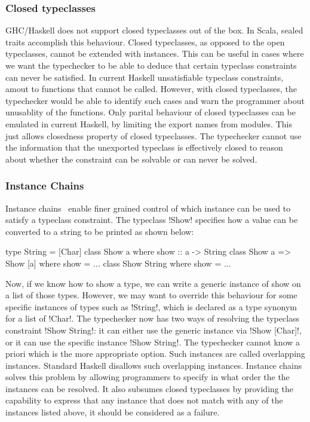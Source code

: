 \documentclass[screen,nonacm,manuscript,review]{acmart} %
\begin{document}
\subsubsection{Closed typeclasses}
GHC/Haskell does not support closed typeclasses out of the box. In Scala, sealed traits accomplish this behaviour. Closed typeclasses, as opposed to the open typeclasses, cannot be extended with instances. This can be useful in cases where we want the typechecker to be able to deduce that certain typeclass constraints can never be satisfied. In current Haskell unsatisfiable typeclass constraints, amout to functions that cannot be called. However, with closed typeclasses, the typechecker would be able to identify such cases and warn the programmer about unusablity of the functions. Only parital behaviour of closed typeclasses can be emulated in current Haskell, by limiting the export names from modules. This just allows closedness property of closed typeclasses. The typechecker cannot use the information that the unexported typeclass is effectively closed to reason about whether the constraint can be solvable or can never be solved.

\subsubsection{Instance Chains}
Instance chains~\cite{morris_instance_2010} enable finer grained control of which instance can be used to satisfy a typeclass constraint. The typeclass !Show! specifies how a value can be converted to a string to be printed as shown below:

\begin{CenteredBox}
\begin{code}
type String = [Char]
class Show a where show :: a -> String
class Show a => Show [a] where show = ...
class Show String where show = ...
\end{code}
\end{CenteredBox}
Now, if we know how to show a type, we can write a generic instance of
show on a list of those types. However, we may want to override this
behaviour for some specific instances of types such as !String!, which
is declared as a type synonym for a list of !Char!. The typechecker
now has two ways of resolving the typeclass constraint !Show String!:
it can either use the generic instance via !Show [Char]!, or it can
use the specific instance !Show String!. The typechecker cannot know a
priori which is the more appropriate option. Such instances are called
overlapping instances. Standard Haskell disallows such overlapping
instances. Instance chains solves this problem by allowing programmers
to specify in what order the the instances can be resolved. It also
subsumes closed typeclasses by providing the capability to express
that any instance that does not match with any of the instances listed
above, it should be considered as a failure.
\end{document}

